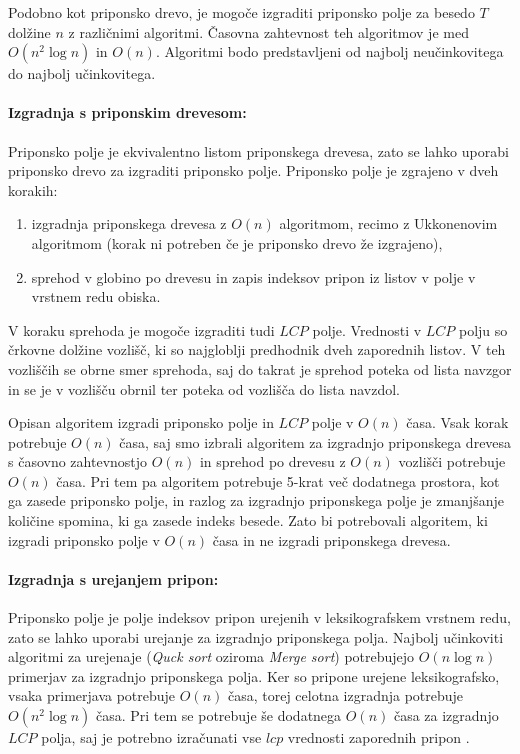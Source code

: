 Podobno kot priponsko drevo, je mogoče izgraditi priponsko polje za besedo $T$ dolžine $n$ z različnimi algoritmi. Časovna zahtevnost teh algoritmov je med $O(n^2\log{n})$ in $O(n)$. Algoritmi bodo predstavljeni od najbolj neučinkovitega do najbolj učinkovitega.

\paragraph{Izgradnja s priponskim drevesom:}
Priponsko polje je ekvivalentno listom priponskega drevesa, zato se lahko uporabi priponsko drevo za izgraditi priponsko polje. Priponsko polje je zgrajeno v dveh korakih:
\begin{enumerate}
    \item izgradnja priponskega drevesa z $O(n)$ algoritmom, recimo z Ukkonenovim algoritmom (korak ni potreben če je priponsko drevo že izgrajeno),
    \item sprehod v globino po drevesu in zapis indeksov pripon iz listov v polje v vrstnem redu obiska.
\end{enumerate}
V koraku sprehoda je mogoče izgraditi tudi $LCP$ polje. Vrednosti v $LCP$ polju so črkovne dolžine vozlišč, ki so najgloblji predhodnik dveh zaporednih listov. V teh vozliščih se obrne smer sprehoda, saj do takrat je sprehod poteka od lista navzgor in se je v vozlišču obrnil ter poteka od vozlišča do lista navzdol.

Opisan algoritem izgradi priponsko polje in $LCP$ polje v $O(n)$ časa. Vsak korak potrebuje $O(n)$ časa, saj smo izbrali algoritem za izgradnjo priponskega drevesa s časovno zahtevnostjo $O(n)$ in sprehod po drevesu z $O(n)$ vozlišči potrebuje $O(n)$ časa. Pri tem pa algoritem potrebuje 5-krat več dodatnega prostora, kot ga zasede priponsko polje, in razlog za izgradnjo priponskega polje je zmanjšanje količine spomina, ki ga zasede indeks besede. Zato bi potrebovali algoritem, ki izgradi priponsko polje v $O(n)$ časa in ne izgradi priponskega drevesa.

\paragraph{Izgradnja s urejanjem pripon:}
Priponsko polje je polje indeksov pripon urejenih v leksikografskem vrstnem redu, zato se lahko uporabi urejanje za izgradnjo priponskega polja. Najbolj učinkoviti algoritmi za urejenaje (\textit{Quck sort} oziroma \textit{Merge sort}) potrebujejo $O(n\log{n})$ primerjav za izgradnjo priponskega polja. Ker so pripone urejene leksikografsko, vsaka primerjava potrebuje $O(n)$ časa, torej celotna izgradnja potrebuje $O(n^2\log{n})$ časa. Pri tem se potrebuje še dodatnega $O(n)$ časa za izgradnjo $LCP$ polja, saj je potrebno izračunati vse $lcp$ vrednosti zaporednih pripon \cite{Kasai2001}.

